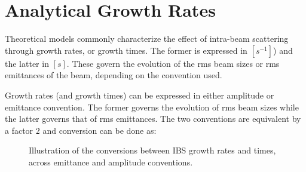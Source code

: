 \section{Analytical Growth Rates}
\label{section:ibs_growth_rates}

Theoretical models commonly characterize the effect of intra-beam scattering through growth rates, or growth times.
The former is expressed in \(\left[s^{-1}\right]\)) and the latter in \(\left[s\right]\).
These govern the evolution of the rms beam sizes or rms emittances of the beam, depending on the convention used.
\newline

Growth rates (and growth times) can be expressed in either amplitude or emittance convention.
The former governs the evolution of rms beam sizes while the latter governs that of rms emittances.
The two conventions are equivalent by a factor \(2\) and conversion can be done as:

\begin{figure}[!htb]
    \centering
    \caption{Illustration of the conversions between IBS growth rates and times, across emittance and amplitude conventions.}
    \label{figure:ibs_convention_conversion}
\end{figure}


